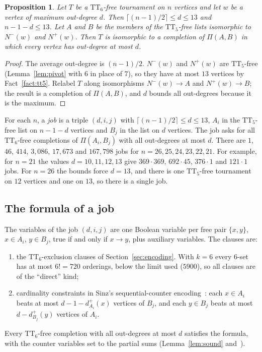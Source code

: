 \documentclass[11pt]{amsart}
\newtheorem{proposition}[theorem]{Proposition}
\theoremstyle{definition}
\theoremstyle{remark}
\newcommand{\TT}[1]{\mathrm{TT}_{#1}}
\newcommand{\Piv}[2]{\Pi(#1,#2)}
\newcommand{\Np}{N^{+}}
\newcommand{\Nm}{N^{-}}
\newcommand{\dpl}{d^{+}}
\begin{document}
\begin{proposition}\label{prop:pivotdec}
Let $T$ be a $\TT{6}$-free tournament on $n$ vertices and let $w$ be a vertex of
maximum out-degree $d$. Then $\lceil (n-1)/2 \rceil \le d \le 13$ and
$n-1-d \le 13$. Let $A$ and $B$ be the members of the $\TT{5}$-free lists
isomorphic to $\Nm(w)$ and $\Np(w)$. Then $T$ is isomorphic to a completion
of $\Piv{A}{B}$ in which every vertex has out-degree at most $d$.
\end{proposition}

\begin{proof}
The average out-degree is $(n-1)/2$. $\Nm(w)$ and $\Np(w)$ are $\TT{5}$-free
(Lemma~\ref{lem:pivot} with $6$ in place of $7$), so they have at most $13$
vertices by Fact~\ref{fact:tt5}. Relabel $T$ along isomorphisms
$\Nm(w) \to A$ and $\Np(w) \to B$; the result is a completion of $\Piv{A}{B}$,
and $d$ bounds all out-degrees because it is the maximum.
\end{proof}

For each $n$, a \emph{job} is a triple $(d,i,j)$ with
$\lceil (n-1)/2 \rceil \le d \le 13$, $A_i$ in the $\TT{5}$-free list on
$n-1-d$ vertices and $B_j$ in the list on $d$ vertices. The job asks for all
$\TT{6}$-free completions of $\Piv{A_i}{B_j}$ with all out-degrees at most $d$.
There are $1$, $46$, $414$, $3{,}086$, $17{,}673$ and $167{,}798$ jobs for
$n=26,25,24,23,22,21$. For example, for $n=21$ the values $d=10,11,12,13$ give
$369\cdot 369$, $692\cdot 45$, $376 \cdot 1$ and $121\cdot 1$ jobs. For
$n=26$ the bounds force $d=13$, and there is one $\TT{5}$-free tournament on
$12$ vertices and one on $13$, so there is a single job.

\subsection{The formula of a job}
The variables of the job $(d,i,j)$ are one Boolean variable per free pair
$\{x,y\}$, $x \in A_i$, $y\in B_j$, true if and only if $x \to y$, plus
auxiliary variables. The clauses are:
\begin{enumerate}[label=(\roman*)]
\item the $\TT{6}$-exclusion clauses of Section~\ref{sec:encoding}. With
  $k=6$ every $6$-set has at most $6!=720$ orderings, below the limit used
  ($5900$), so all clauses are of the ``direct'' kind;
\item cardinality constraints in Sinz's sequential-counter
  encoding~\cite{Sinz05}: each $x \in A_i$ beats at most
  $d-1-\dpl_{A_i}(x)$ vertices of $B_j$, and each $y \in B_j$ beats at most
  $d-\dpl_{B_j}(y)$ vertices of $A_i$.
\end{enumerate}
Every $\TT{6}$-free completion with all out-degrees at most $d$ satisfies the
formula, with the counter variables set to the partial sums
(Lemma~\ref{lem:sound} and~\cite{Sinz05}).
\end{document}
